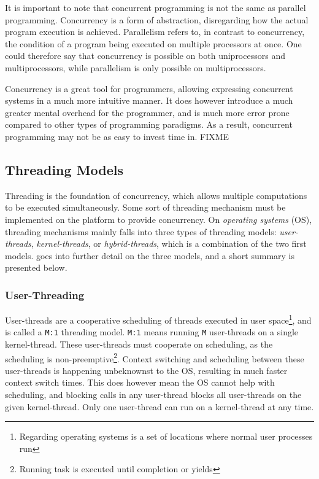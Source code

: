 It is important to note that concurrent programming is not the same as parallel programming. Concurrency is a form of abstraction, disregarding how the actual program execution is achieved. Parallelism refers to, in contrast to concurrency, the condition of a program being executed on multiple processors at once. One could therefore say that concurrency is possible on both uniprocessors and multiprocessors, while parallelism is only possible on multiprocessors.

Concurrency is a great tool for programmers, allowing expressing concurrent systems in a much more intuitive manner. It does however introduce a much greater mental overhead for the programmer, and is much more error prone compared to other types of programming paradigms. As a result, concurrent programming may not be as easy to invest time in. FIXME


\subsection{Threading Models}
\label{subsec:threading_models}

Threading is the foundation of concurrency, which allows multiple computations to be executed simultaneously. Some sort of threading mechanism must be implemented on the platform to provide concurrency. On \textit{operating systems} (OS), threading mechanisms mainly falls into three types of threading models: \textit{user-threads}, \textit{kernel-threads}, or \textit{hybrid-threads}, which is a combination of the two first models. \citet{c++csp2} goes into further detail on the three models, and a short summary is presented below.


\subsubsection{User-Threading}

User-threads are a cooperative scheduling of threads executed in user space\footnote{Regarding operating systems is a set of locations where normal user processes run}, and is called a \texttt{M:1} threading model. \texttt{M:1} means running \texttt{M} user-threads on a single kernel-thread. These user-threads must cooperate on scheduling, as the scheduling is non-preemptive\footnote{Running task is executed until completion or yields}. Context switching and scheduling between these user-threads is happening unbeknownst to the OS, resulting in much faster context switch times. This does however mean the OS cannot help with scheduling, and blocking calls in any user-thread blocks all user-threads on the given kernel-thread. Only one user-thread can run on a kernel-thread at any time.


